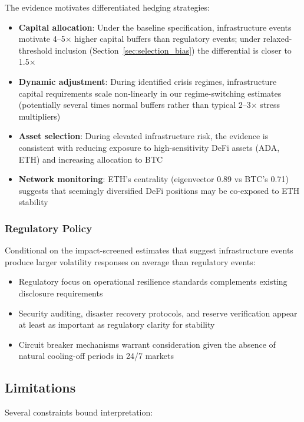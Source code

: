 \documentclass[pdflatex,sn-mathphys-num]{sn-jnl}
\theoremstyle{thmstyleone}
\theoremstyle{thmstyletwo}
\theoremstyle{thmstylethree}
\begin{document}
The evidence motivates differentiated hedging strategies:
\begin{itemize}[nosep]
\item \textbf{Capital allocation}: Under the baseline specification, infrastructure events motivate 4--5$\times$ higher capital buffers than regulatory events; under relaxed-threshold inclusion (Section~\ref{sec:selection_bias}) the differential is closer to 1.5$\times$
\item \textbf{Dynamic adjustment}: During identified crisis regimes, infrastructure capital requirements scale non-linearly in our regime-switching estimates (potentially several times normal buffers rather than typical 2--3$\times$ stress multipliers)
\item \textbf{Asset selection}: During elevated infrastructure risk, the evidence is consistent with reducing exposure to high-sensitivity DeFi assets (ADA, ETH) and increasing allocation to BTC
\item \textbf{Network monitoring}: ETH's centrality (eigenvector 0.89 vs BTC's 0.71) suggests that seemingly diversified DeFi positions may be co-exposed to ETH stability
\end{itemize}

\subsubsection{Regulatory Policy}

Conditional on the impact-screened estimates that suggest infrastructure events produce larger volatility responses on average than regulatory events:
\begin{itemize}[nosep]
\item Regulatory focus on operational resilience standards complements existing disclosure requirements
\item Security auditing, disaster recovery protocols, and reserve verification appear at least as important as regulatory clarity for stability
\item Circuit breaker mechanisms warrant consideration given the absence of natural cooling-off periods in 24/7 markets
\end{itemize}

\subsection{Limitations}\label{sec:limitations}

Several constraints bound interpretation:
\end{document}
